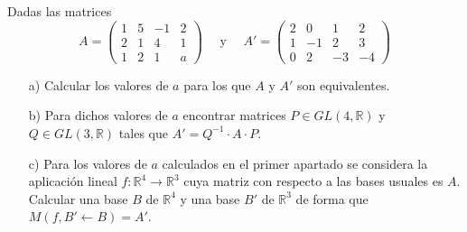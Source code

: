 \begin{ejercicio}
    Dadas las matrices 
    \begin{equation*}
        A = \begin{pmatrix} 1 & 5 & -1 & 2 \\ 2 & 1 & 4 & 1 \\ 1 & 2 & 1 & a \end{pmatrix} \quad \text{ y } \quad A' = \begin{pmatrix} 2 & 0 & 1 & 2 \\ 1 & -1 & 2 & 3 \\ 0 & 2 & -3 & -4 \end{pmatrix}
    \end{equation*}
    \begin{enumerate}
        \item[a)] Calcular los valores de $a$ para los que $A$ y $A'$ son equivalentes.
        \item[b)] Para dichos valores de $a$ encontrar matrices $P \in GL(4, \mathbb{R})$ y $Q \in GL(3, \mathbb{R})$ tales que $A' = Q^{-1} \cdot A \cdot P$.
        \item[c)] Para los valores de $a$ calculados en el primer apartado se considera la aplicación lineal $f: \mathbb{R}^4 \rightarrow \mathbb{R}^3$ cuya matriz con respecto a las bases usuales es $A$. Calcular una base $B$ de $\mathbb{R}^4$ y una base $B'$ de $\mathbb{R}^3$ de forma que $M(f, B' \leftarrow B) = A'$.
    \end{enumerate}
\end{ejercicio}


